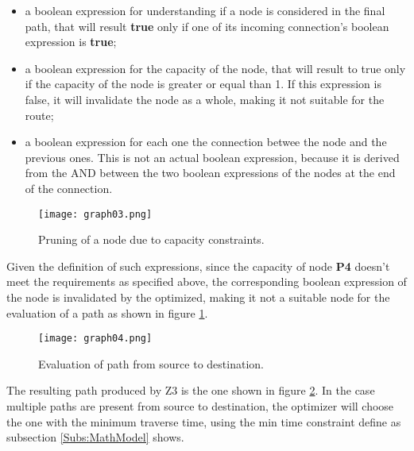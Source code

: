 \begin{itemize}
  \item a boolean expression for understanding if a node is considered in the final path, that will result \textbf{true} only if one of its incoming connection's boolean expression is \textbf{true};
  \item a boolean expression for the capacity of the node, that will result to true only if the capacity of the node is greater or equal than 1. If this expression is false, it will invalidate the node as a whole, making it not suitable for the route;
  \item a boolean expression for each one the connection betwee the node and the previous ones. This is not an actual boolean expression, because it is derived from the AND between the two boolean expressions of the nodes at the end of the connection.
\end{itemize}
\begin{figure}[!htb]
   \centering
   \texttt{[image: graph03.png]}
   \caption{Pruning of a node due to capacity constraints.}\label{Fig:Graph03}
\end{figure}
Given the definition of such expressions, since the capacity of node \textbf{P4} doesn't meet the requirements as specified above, the corresponding boolean expression of the node is invalidated by the optimized, making it not a suitable node for the evaluation of a path as shown in figure \ref{Fig:Graph03}.
\begin{figure}[!htb]
   \centering
   \texttt{[image: graph04.png]}
   \caption{Evaluation of path from source to destination.}\label{Fig:Graph04}
\end{figure}
The resulting path produced by Z3 is the one shown in figure \ref{Fig:Graph04}. In the case multiple paths are present from source to destination, the optimizer will choose the one with the minimum traverse time, using the min time constraint define as subsection \ref{Subs:MathModel} shows.
